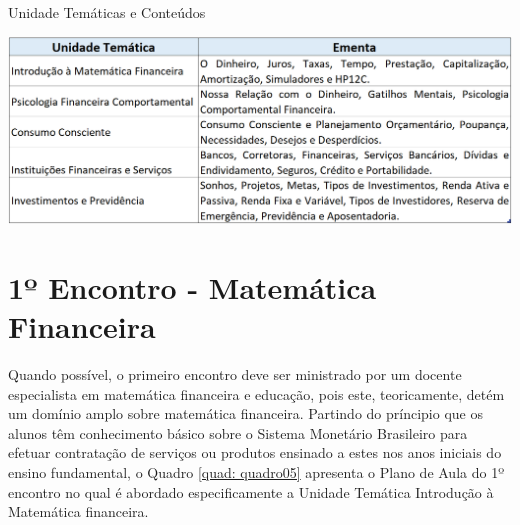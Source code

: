 \graphicspath{{quadros/}} 
\begin{quadro}[!ht]
\centering
\begin{minipage}{1.\textwidth}
\caption{Unidade Temáticas e Conteúdos}
\centering
\includegraphics[width=1.0\textwidth]{quadro-4_tematica}
\label{quad: quadro04}
\end{minipage}
\end{quadro}

\section{1º Encontro - Matemática Financeira}
Quando possível, o primeiro encontro deve ser ministrado por um docente especialista em matemática financeira e educação, pois este, teoricamente, detém um domínio amplo sobre matemática financeira. Partindo do príncipio que os alunos têm conhecimento básico sobre o Sistema Monetário Brasileiro para efetuar contratação de serviços ou produtos ensinado a estes nos anos iniciais do ensino fundamental, o Quadro \ref{quad: quadro05} apresenta o Plano de Aula do 1º encontro no qual é abordado especificamente a Unidade Temática Introdução à Matemática financeira.

\newpage

